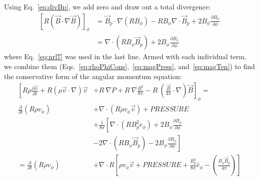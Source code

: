 Using Eq.~\ref{eq:divBp}, we add zero and draw out a total divergence:
\begin{align}
  \left[R\left(\vec B\cdot\nabla\vec B\right)\right]_\phi&=\vec B_p\cdot\nabla\left(RB_\phi\right)-RB_\phi\nabla\cdot\vec B_p+2B_\phi\frac{\partial B_\phi}{\partial\phi}\\
  &=\nabla\cdot\left(RB_\phi\vec B_p\right)+2B_\phi\frac{\partial B_\phi}{\partial\phi} \label{eq:magTen}
\end{align}
where Eq.~\ref{eq:nrl7} was used in the last line. Armed with each individual term, we combine them (Eqs.~\ref{eq:rhoPhiCons},~\ref{eq:magPress}, and~\ref{eq:magTen}) to find the conservative form of the angular momentum equation:
\begin{align}
\left[R\rho\frac{\partial\vec v}{\partial t}+R\left(\rho\vec v\cdot\nabla\right)\vec v\right.&\left.+R~\nabla P+R~\nabla\frac{B^2}{8\pi}-R~\left(\frac{\vec B}{4\pi}\cdot\nabla\right)\vec B\right]_\phi=\nonumber\\
\frac\partial{\partial t}\left(R\rho v_\phi\right)&+\nabla\cdot\left(R\rho v_\phi\vec v\right)+PRESSURE\nonumber\\
&+\frac{1}{8\pi}\left[\nabla\cdot\left(RB_p^2\hat e_\phi\right)+2B_\phi\frac{\partial B_\phi}{\partial\phi} \right.\nonumber\\
 &\left.-2\nabla\cdot\left(RB_\phi\vec B_p\right)-2B_\phi\frac{\partial B_\phi}{\partial\phi}\right]\nonumber\\
=\frac\partial{\partial t}\left(R\rho v_\phi\right)&+\nabla\cdot R\left[\rho v_\phi\vec v+PRESSURE+\frac{B_p^2}{8\pi}\hat e_\phi-\left(\frac{B_\phi\vec B_p}{4\pi}\right)\right]
\end{align}
